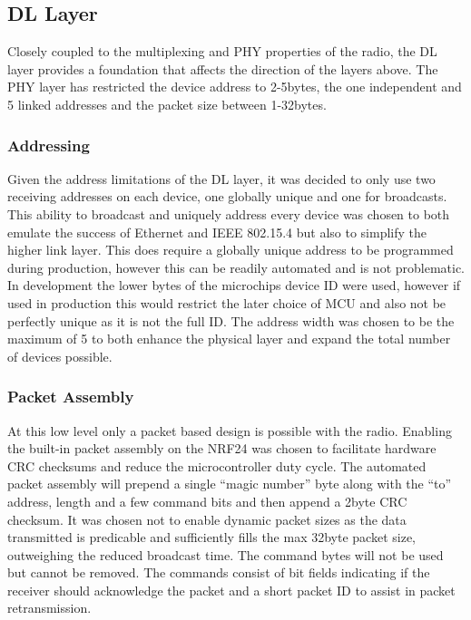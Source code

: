 \subsection{\acf{DL} Layer}
Closely coupled to the multiplexing and \ac{PHY} properties of the radio, the \ac{DL} layer provides
a foundation that affects the direction of the layers above. The PHY layer has restricted the device
address to 2-5bytes, the one independent and 5 linked addresses and the packet size between 1-32bytes.


\subsubsection{Addressing}
Given the address limitations of the \ac{DL} layer, it was decided to only use two receiving addresses on
each device, one globally unique and one for broadcasts. This ability to broadcast and uniquely
address every device was chosen to both emulate the success of Ethernet and IEEE 802.15.4 but also
to simplify the higher link layer. This does require a globally unique address to be programmed
during production, however this can be readily automated and is not problematic. In development
the lower bytes of the microchips device ID were used, however if used in production this would
restrict the later choice of \ac{MCU} and also not be perfectly unique as it is not the full ID. The
address width was chosen to be the maximum of 5 to both enhance the physical layer and expand
the total number of devices possible.

\subsubsection{Packet Assembly}
At this low level only a packet based design is possible with the radio. Enabling the built-in packet
assembly on the \ac{NRF24} was chosen to facilitate hardware \ac{CRC} checksums and reduce the
microcontroller duty cycle. The automated packet assembly will prepend a single ``magic number''
byte along with the ``to'' address, length and a few command bits and then append a 2byte CRC
checksum. It was chosen not to enable dynamic packet sizes as the data transmitted is predicable and
sufficiently fills the max 32byte packet size, outweighing the reduced broadcast time.
The command bytes will not be used but cannot be removed. The commands consist of bit
fields indicating if the receiver should acknowledge the packet and a short packet
ID to assist in packet retransmission.

